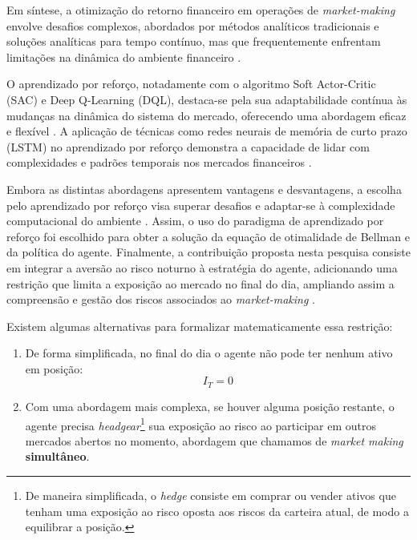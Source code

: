Em síntese, a otimização do retorno financeiro em operações de \textit{market-making} envolve desafios complexos, abordados por métodos analíticos tradicionais e soluções analíticas para tempo contínuo, mas que frequentemente enfrentam limitações na dinâmica do ambiente financeiro \citep{Avellaneda2008, rao2020stochastic, Gasperov2021}.

O aprendizado por reforço, notadamente com o algoritmo Soft Actor-Critic (SAC) e Deep Q-Learning (DQL), destaca-se pela sua adaptabilidade contínua às mudanças na dinâmica do sistema do mercado, oferecendo uma abordagem eficaz e flexível \citep{Ganesh2019, bakshaev2020, Sutton2018}. A aplicação de técnicas como redes neurais de memória de curto prazo (LSTM) no aprendizado por reforço demonstra a capacidade de lidar com complexidades e padrões temporais nos mercados financeiros \citep{WOS:000747190900001}.

Embora as distintas abordagens apresentem vantagens e desvantagens, a escolha pelo aprendizado por reforço visa superar desafios e adaptar-se à complexidade computacional do ambiente \citep{WOS:000963297000001}. Assim, o uso do paradigma de aprendizado por reforço foi escolhido para obter a solução da equação de otimalidade de Bellman e da política do agente. Finalmente, a contribuição proposta nesta pesquisa consiste em integrar a aversão ao risco noturno à estratégia do agente, adicionando uma restrição que limita a exposição ao mercado no final do dia, ampliando assim a compreensão e gestão dos riscos associados ao \textit{market-making} \citep{almgren2000}. 

Existem algumas alternativas para formalizar matematicamente essa restrição:
\begin{enumerate}
    \item De forma simplificada, no final do dia o agente não pode ter nenhum ativo em posição: 
    \begin{equation}
        I_{T} = 0
        \label{eq:inventory_restriction}
    \end{equation}
    \item Com uma abordagem mais complexa, se houver alguma posição restante, o agente precisa \textit{headgear}\footnote{De maneira simplificada, o \textit{hedge} consiste em comprar ou vender ativos que tenham uma exposição ao risco oposta aos riscos da carteira atual, de modo a equilibrar a posição.} sua exposição ao risco ao participar em outros mercados abertos no momento, abordagem que chamamos de \textit{market making} \textbf{simultâneo}.
\end{enumerate}
